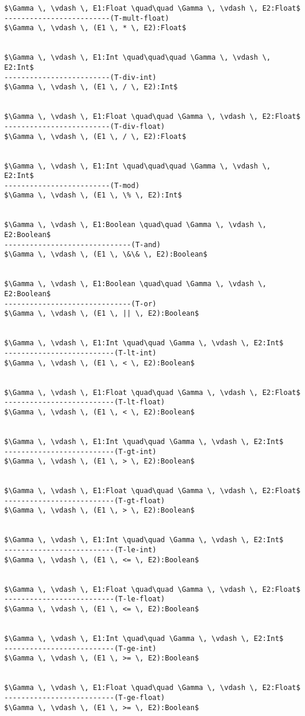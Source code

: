 \documentclass[11pt, a4paper]{article}
\begin{document}
\begin{lstlisting}
$\Gamma \, \vdash \, E1:Float \quad\quad \Gamma \, \vdash \, E2:Float$
-------------------------(T-mult-float)
$\Gamma \, \vdash \, (E1 \, * \, E2):Float$


$\Gamma \, \vdash \, E1:Int \quad\quad\quad \Gamma \, \vdash \, E2:Int$
-------------------------(T-div-int)
$\Gamma \, \vdash \, (E1 \, / \, E2):Int$


$\Gamma \, \vdash \, E1:Float \quad\quad \Gamma \, \vdash \, E2:Float$
-------------------------(T-div-float)
$\Gamma \, \vdash \, (E1 \, / \, E2):Float$


$\Gamma \, \vdash \, E1:Int \quad\quad\quad \Gamma \, \vdash \, E2:Int$
-------------------------(T-mod)
$\Gamma \, \vdash \, (E1 \, \% \, E2):Int$


$\Gamma \, \vdash \, E1:Boolean \quad\quad \Gamma \, \vdash \, E2:Boolean$
------------------------------(T-and)
$\Gamma \, \vdash \, (E1 \, \&\& \, E2):Boolean$


$\Gamma \, \vdash \, E1:Boolean \quad\quad \Gamma \, \vdash \, E2:Boolean$
------------------------------(T-or)
$\Gamma \, \vdash \, (E1 \, || \, E2):Boolean$


$\Gamma \, \vdash \, E1:Int \quad\quad \Gamma \, \vdash \, E2:Int$
--------------------------(T-lt-int)
$\Gamma \, \vdash \, (E1 \, < \, E2):Boolean$


$\Gamma \, \vdash \, E1:Float \quad\quad \Gamma \, \vdash \, E2:Float$
--------------------------(T-lt-float)
$\Gamma \, \vdash \, (E1 \, < \, E2):Boolean$


$\Gamma \, \vdash \, E1:Int \quad\quad \Gamma \, \vdash \, E2:Int$
--------------------------(T-gt-int)
$\Gamma \, \vdash \, (E1 \, > \, E2):Boolean$


$\Gamma \, \vdash \, E1:Float \quad\quad \Gamma \, \vdash \, E2:Float$
--------------------------(T-gt-float)
$\Gamma \, \vdash \, (E1 \, > \, E2):Boolean$


$\Gamma \, \vdash \, E1:Int \quad\quad \Gamma \, \vdash \, E2:Int$
--------------------------(T-le-int)
$\Gamma \, \vdash \, (E1 \, <= \, E2):Boolean$


$\Gamma \, \vdash \, E1:Float \quad\quad \Gamma \, \vdash \, E2:Float$
--------------------------(T-le-float)
$\Gamma \, \vdash \, (E1 \, <= \, E2):Boolean$


$\Gamma \, \vdash \, E1:Int \quad\quad \Gamma \, \vdash \, E2:Int$
--------------------------(T-ge-int)
$\Gamma \, \vdash \, (E1 \, >= \, E2):Boolean$


$\Gamma \, \vdash \, E1:Float \quad\quad \Gamma \, \vdash \, E2:Float$
--------------------------(T-ge-float)
$\Gamma \, \vdash \, (E1 \, >= \, E2):Boolean$



\end{lstlisting}
\end{document}
